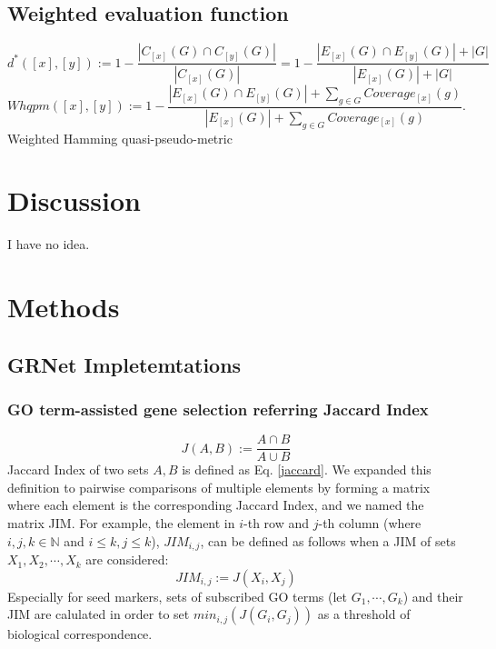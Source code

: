 \documentclass{article}
\begin{document}
\subsection*{Weighted evaluation function}
\begin{equation}\label{HQPM}
  d^*([x], [y]) := 1 - \frac{|C_{[x]}(G)\cap C_{[y]}(G)|}{|C_{[x]}(G)|}
  =1 - \frac{
    |E_{[x]}(G)\cap E_{[y]}(G)|+|G|
  }{
    |E_{[x]}(G)|+|G|
  }
\end{equation}
\begin{equation}\label{WHQPM}
  Whqpm([x], [y]) := 1 - \frac{
    |E_{[x]}(G)\cap E_{[y]}(G)|+\sum_{g\in G}Coverage_{[x]}(g)
  }{
    |E_{[x]}(G)|+\sum_{g\in G}Coverage_{[x]}(g)
  }.
\end{equation}
Weighted Hamming quasi-pseudo-metric

\section*{Discussion}
I have no idea.

\section*{Methods}
\subsection*{GRNet Impletemtations}

\subsubsection*{GO term-assisted gene selection referring Jaccard Index}
\begin{equation}\label{jaccard}
  J(A, B) := \frac{A\cap B}{A\cup B}
\end{equation}
Jaccard Index of two sets $A, B$ is defined as Eq. \eqref{jaccard}. We expanded this 
definition to pairwise comparisons of multiple elements by forming a matrix 
where each element is the corresponding Jaccard Index, and we named the matrix \ac{JIM}. For example, the element in 
$i$-th row and $j$-th column (where $i, j, k\in\mathbb{N}$ and $i\leq k, j\leq k$), $JIM_{i,j}$, can be defined as
follows when a JIM of sets $X_1, X_2,\cdots, X_k$ are considered:
\begin{equation}\label{jim}
  JIM_{i, j} := J(X_i, X_j)
\end{equation}
Especially for seed markers, sets of subscribed GO terms (let $G_1, \cdots, G_k$)
and their JIM are calulated in order to set $min_{i,j}(J(G_i, G_j))$ as a threshold of 
biological correspondence.
\end{document}
